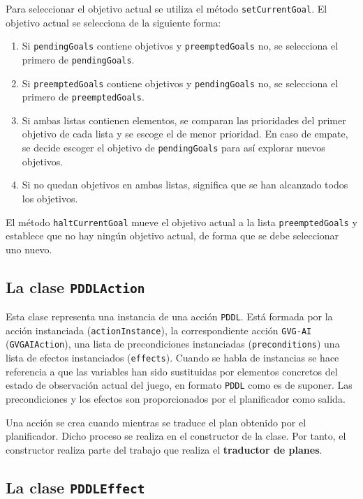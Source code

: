 Para seleccionar el objetivo actual se utiliza el método \texttt{setCurrentGoal}. El objetivo actual
se selecciona de la siguiente forma:

\begin{enumerate}[label=\arabic*º]
    \item Si \texttt{pendingGoals} contiene objetivos y \texttt{preemptedGoals} no, se selecciona
    el primero de \texttt{pendingGoals}.
    \item Si \texttt{preemptedGoals} contiene objetivos y \texttt{pendingGoals} no, se selecciona
    el primero de \texttt{preemptedGoals}.
    \item Si ambas listas contienen elementos, se comparan las prioridades del primer objetivo
    de cada lista y se escoge el de menor prioridad. En caso de empate, se decide escoger el
    objetivo de \texttt{pendingGoals} para así explorar nuevos objetivos.
    \item Si no quedan objetivos en ambas listas, significa que se han alcanzado todos los objetivos.
\end{enumerate}

El método \texttt{haltCurrentGoal} mueve el objetivo actual a la lista \texttt{preemptedGoals}
y establece que no hay ningún objetivo actual, de forma que se debe seleccionar uno nuevo.

\subsection{La clase \texttt{PDDLAction}}

Esta clase representa una instancia de una acción \texttt{PDDL}. Está formada por la acción instanciada
(\texttt{actionInstance}), la correspondiente acción \texttt{GVG-AI} (\texttt{GVGAIAction}), una lista
de precondiciones instanciadas (\texttt{preconditions}) una lista de efectos instanciados (\texttt{effects}).
Cuando se habla de instancias se hace referencia a que las variables han sido sustituidas por elementos
concretos del estado de observación actual del juego, en formato \texttt{PDDL} como es de suponer.
Las precondiciones y los efectos son proporcionados por el planificador como salida.

Una acción se crea cuando mientras se traduce el plan obtenido por el planificador. Dicho proceso
se realiza en el constructor de la clase. Por tanto, el constructor realiza parte del trabajo que realiza
el \textbf{traductor de planes}.

\subsection{La clase \texttt{PDDLEffect}}

